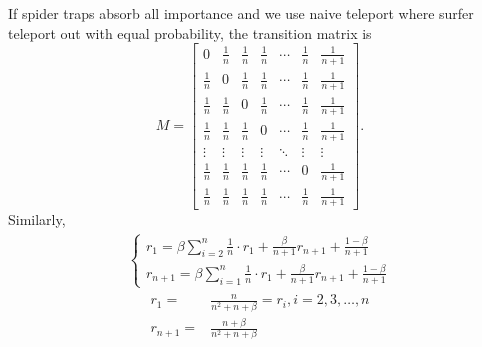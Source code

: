 \documentclass{article}
\begin{document}
If spider traps absorb all importance and we use naive teleport where surfer teleport out with equal probability, the transition matrix is
\begin{equation}
	M = \begin{bmatrix}
		0           & \frac{1}{n} & \frac{1}{n} & \frac{1}{n} & \cdots & \frac{1}{n} & \frac{1}{n+1} \\
		\frac{1}{n} & 0           & \frac{1}{n} & \frac{1}{n} & \cdots & \frac{1}{n} & \frac{1}{n+1} \\
		\frac{1}{n} & \frac{1}{n} & 0           & \frac{1}{n} & \cdots & \frac{1}{n} & \frac{1}{n+1} \\
		\frac{1}{n} & \frac{1}{n} & \frac{1}{n} & 0           & \cdots & \frac{1}{n} & \frac{1}{n+1} \\
		\vdots      & \vdots      & \vdots      & \vdots      & \ddots & \vdots      & \vdots        \\
		\frac{1}{n} & \frac{1}{n} & \frac{1}{n} & \frac{1}{n} & \cdots & 0           & \frac{1}{n+1} \\
		\frac{1}{n} & \frac{1}{n} & \frac{1}{n} & \frac{1}{n} & \cdots & \frac{1}{n} & \frac{1}{n+1}
	\end{bmatrix}.
\end{equation}
Similarly,
\begin{align}
	\begin{cases}
		r_1 = \beta \sum_{i=2}^{n}\frac{1}{n}\cdot r_1 + \frac{\beta}{n+1} r_{n+1} + \frac{1-\beta}{n+1} \\
		r_{n+1} = \beta \sum_{i=1}^{n}\frac{1}{n}\cdot r_1 + \frac{\beta}{n+1} r_{n+1} + \frac{1-\beta}{n+1}
	\end{cases}
\end{align}
\begin{align}
	r_1 =& \frac{n}{n^2+n+\beta} = r_i, i=2, 3, \dots, n \\
	r_{n+1} =& \frac{n+\beta}{n^2+n+\beta}
\end{align}
\end{document}
